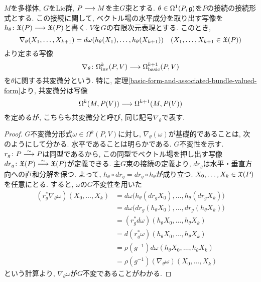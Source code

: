 \begin{dfn}
$M$を多様体, $G$をLie群, $P \longrightarrow M$を主$G$束とする.
$\theta \in \Omega^1(P, \mathfrak{g})$を$P$の接続の接続形式とする.
この接続に関して, ベクトル場の水平成分を取り出す写像を
$h_\theta \colon \mathfrak{X}(P) \longrightarrow \mathfrak{X}(P)$と書く.
$V$を$G$の有限次元表現とする.
このとき,
\begin{equation}
\nabla_\theta(X_1, \ldots, X_{k+1}) =
d\omega(h_\theta(X_1), \ldots, h_\theta(X_{k+1})) \quad (X_1, \ldots, X_{k+1} \in \mathfrak{X}(P))
\end{equation}
より定まる写像
\begin{equation}
\nabla_\theta \colon \Omega^k_\mathrm{inv}(P,V) \longrightarrow \Omega^{k+1}_\mathrm{basic}(P,V)
\end{equation}
を$\theta$に関する共変微分という.
特に,
定理\ref{basic-form-and-associated-bundle-valued-form}より, 共変微分は写像
\begin{equation}
\Omega^k(M, P(V)) \longrightarrow \Omega^{k+1}(M, P(V))
\end{equation}
を定めるが, こちらも共変微分と呼び, 同じ記号$\nabla_\theta$で表す.
\end{dfn}

\begin{proof}
$G$不変微分形式$\omega \in \Omega^k(P, V)$に対し,
$\nabla_\theta (\omega)$が基礎的であることは, 次のようにして分かる.
水平であることは明らかである.
$G$不変性を示す.
$r_g \colon P \stackrel{\sim}{\longrightarrow} P$は同型であるから, この同型でベクトル場を押し出す写像
$dr_g \colon \mathfrak{X}(P) \stackrel{\sim}{\longrightarrow} \mathfrak{X}(P)$が定義できる.
主$G$束の接続の定義より, $dr_g$は水平・垂直方向への直和分解を保つ.
よって, $h_\theta \circ dr_g = dr_g \circ h_\theta$が成り立つ.
$X_0, \ldots, X_k \in \mathfrak{X}(P)$を任意にとる.
すると, $\omega$の$G$不変性を用いた
\begin{align*}
(r_g^* \nabla_\theta \omega)(X_0, \ldots, X_k) &= d\omega \bigl(h_\theta(dr_gX_0),
  \ldots, h_\theta (dr_gX_k) \bigr) \\ &=
d\omega \bigl(dr_g (h_\theta X_0),
  \ldots, dr_g (h_\theta X_k) \bigr) \\ &=
(r_g^* d\omega)(h_\theta X_0, \ldots, h_\theta X_k) \\ &=
d (r_g^* \omega)(h_\theta X_0, \ldots, h_\theta X_k) \\ &=
\rho(g^{-1})d\omega(h_\theta X_0, \ldots, h_\theta X_k) \\ &=
\rho(g^{-1}) (\nabla_\theta \omega) (X_0, \ldots, X_k)
\end{align*}
という計算より, $\nabla_\theta \omega$が$G$不変であることがわかる.
\end{proof}

